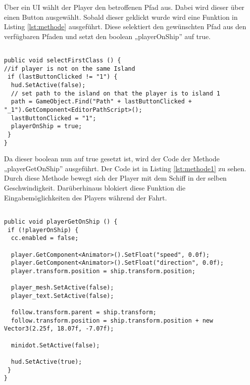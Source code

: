 Über ein \ac{UI} wählt der Player den betroffenen Pfad aus. Dabei wird dieser über einen Button ausgewählt. Sobald dieser geklickt wurde wird eine Funktion in Listing \ref{lst:methode} ausgeführt. Diese selektiert den gewünschten Pfad aus den verfügbaren Pfaden und setzt den boolean „playerOnShip” auf true. 

\begin{scriptsize}
\lstset{
	float,
	caption=Methode selectFirstClass, 
	language=[Sharp]C, 
	frame=single,  
	showstringspaces=false, 
	showspaces=false, 
	numbers=left, 
	captionpos=b, 
	belowcaptionskip=4pt,
	basicstyle=\ttfamily
} 
\begin{lstlisting}[label=lst:methode]

public void selectFirstClass () {
//if player is not on the same Island
 if (lastButtonClicked != "1") {
  hud.SetActive(false);
  // set path to the island on that the player is to island 1
  path = GameObject.Find("Path" + lastButtonClicked + "_1").GetComponent<EditorPathScript>();
  lastButtonClicked = "1";
  playerOnShip = true;
 }
}

\end{lstlisting}
\end{scriptsize}

Da dieser boolean nun auf true gesetzt ist, wird der Code der Methode „playerGetOnShip” ausgeführt. Der Code ist in Listing \ref{lst:methode1} zu sehen. Durch diese Methode bewegt sich der Player mit dem Schiff in der selben Geschwindigkeit. Darüberhinaus blokiert diese Funktion die Eingabemöglichkeiten des Players während der Fahrt.

\begin{scriptsize}
\lstset{
	float,
	caption=Methode playerGetOnShip, 
	language=[Sharp]C, 
	frame=single,  
	showstringspaces=false, 
	showspaces=false, 
	numbers=left, 
	captionpos=b, 
	belowcaptionskip=4pt,
	basicstyle=\ttfamily
} 
\begin{lstlisting}[label=lst:methode1]

public void playerGetOnShip () {
 if (!playerOnShip) {
  cc.enabled = false;

  player.GetComponent<Animator>().SetFloat("speed", 0.0f);
  player.GetComponent<Animator>().SetFloat("direction", 0.0f);
  player.transform.position = ship.transform.position;

  player_mesh.SetActive(false);
  player_text.SetActive(false);

  follow.transform.parent = ship.transform;
  follow.transform.position = ship.transform.position + new Vector3(2.25f, 18.07f, -7.07f);

  minidot.SetActive(false);

  hud.SetActive(true);
 }
}

\end{lstlisting}
\end{scriptsize}

